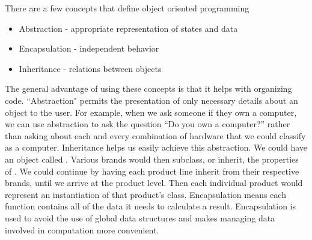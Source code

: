 There are a few concepts that define object oriented programming

\begin{itemize}

\item Abstraction - appropriate representation of states and data

\item Encapsulation - independent behavior

\item Inheritance - relations between objects

\end{itemize}

The general advantage of using these concepts is that it helps with organizing code.
``Abstraction" permits the presentation of only necessary details about an object to the user.
For example, when we ask someone if they own a computer, we can use abstraction to ask the question ``Do you own a computer?'' rather than asking about each and every combination of hardware that we could classify as a computer.
Inheritance helps us easily achieve this abstraction.
We could have an object called .
Various brands would then subclass, or inherit, the properties of .
We could continue by having each product line inherit from their respective brands, until we arrive at the product level.
Then each individual product would represent an instantiation of that product's class.
Encapsulation means each function contains all of the data it needs to calculate a result.
Encapsulation is used to avoid the use of global data structures and makes managing data involved in computation more convenient.

